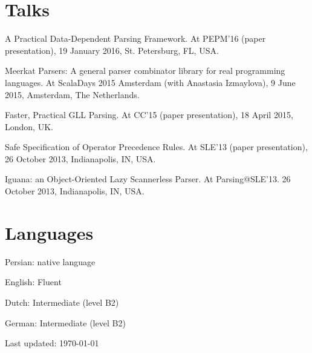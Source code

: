 \documentclass[letterpaper,11pt]{article}
\renewenvironment{itemize}{
  \begin{list}{}{
    \setlength{\leftmargin}{1.5em}
  }
}{
  \end{list}
}
\begin{document}
\nocite{*}


\renewcommand\refname{Publications}



\section*{Talks}

\begin{itemize}
\item A Practical Data-Dependent Parsing Framework. At PEPM'16 (paper presentation),
19 January 2016, St. Petersburg, FL, USA.

\item Meerkat Parsers: A general parser combinator library for real programming languages.
At ScalaDays 2015 Amsterdam (with Anastasia Izmaylova), 9 June 2015, Amsterdam,
The Netherlands.

\item Faster, Practical GLL Parsing. At CC'15 (paper presentation), 18 April 2015,
London, UK.

\item Safe Specification of Operator Precedence Rules. At SLE'13 (paper presentation),
26 October 2013, Indianapolis, IN, USA.

\item Iguana: an Object-Oriented Lazy Scannerless Parser. At Parsing@SLE'13. 
26 October 2013, Indianapolis, IN, USA.

\end{itemize}

\section*{Languages}

\begin{minipage}{.5\textwidth}
\begin{itemize}
\item Persian: native language
\item English: Fluent
\end{itemize}
\end{minipage}
\begin{minipage}{.5\textwidth}
\begin{itemize}
\item Dutch: Intermediate (level B2)
\item German: Intermediate (level B2)
\end{itemize}
\end{minipage}

\bigskip

\begin{center}
  \begin{footnotesize}
    Last updated: \today
  \end{footnotesize}
\end{center}
\end{document}
